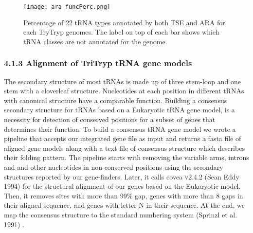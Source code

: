 \documentclass[
12pt, %
a4paper, %
oneside, %
headinclude,footinclude, %
BCOR5mm, %
]{scrartcl}
\begin{document}
\begin{figure}[tb]
\centering 
\texttt{[image: ara\_funcPerc.png]} 
\caption[Genome Comparison]{Percentage of 22 tRNA types annotated by both TSE and ARA for each TryTryp genomes. The label on top of each bar shows which tRNA classes are not annotated for the genome.} %
\label{fig:types} 
\end{figure}

\subsubsection*{4.1.3 Alignment of TriTryp tRNA gene models}

The secondary structure of most tRNAs is made up of three stem-loop and one stem with a cloverleaf structure. Nucleotides at each position in different tRNAs with canonical structure \cite{Sprinzl} have a comparable function. Building a consensus secondary structure for tRNAs based on a Eukaryotic tRNA gene model, is a necessity for detection of conserved positions for a subset of genes that determines their function. To build a consensus tRNA gene model we wrote a pipeline that accepts our integrated gene file as input and returns a fasta file of aligned gene models along with a text file of consensus structure which describes their folding pattern. The pipeline starts with removing the variable arms, introns and and other nucleotides in non-conserved positions using the secondary structures reported by our gene-finders. Later, it calls covea v2.4.2 (Sean Eddy 1994) for the structural alignment of our genes based on the Eukaryotic model. Then, it removes sites with more than 99\% gap, genes with more than 8 gaps in their aligned sequence, and genes with letter N in their sequence. At the end, we map the consensus structure to the standard numbering system (Sprinzl et al. 1991) \cite{Sprinzl}.
\end{document}

